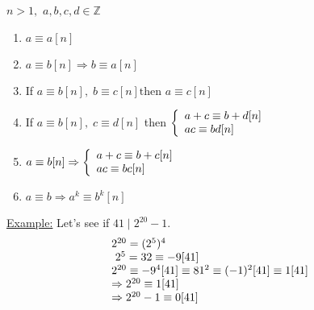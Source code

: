 \documentclass{report}
\begin{document}
\begin{thm} $n>1,$  $a,b,c,d \in \mathbb{Z}$
\begin{enumerate}
\item $a \equiv a[n]$
\item $a \equiv b[n] \Rightarrow b \equiv a [n]$
\item If  $a \equiv b[n], \; b \equiv c[n] \text{then } a\equiv c [n]$
\item If  $a \equiv b[n], \; c \equiv d[n]$ then $
	\left \{
	\begin{array}{l l l}
	a+c \equiv b+d [n]\\
	ac \equiv bd [n]
	\end{array}
	\right.
$
\item $a \equiv b[n] \Rightarrow 
	\left \{
	\begin{array}{l l l}
	a+c \equiv b+c[n]\\
	ac\equiv bc[n]
	\end{array}
	\right.
$
\item $a \equiv b \Rightarrow a^k \equiv b^k [n]$
\end{enumerate} 
\end{thm}
\underline{Example:}
Let's see if $41 \mid 2^{20}-1$.
\[
\begin{array}{l l l}
2^{20}=(2^5)^4\\\
2^5=32 \equiv -9[41]\\
2^{20} \equiv -9^4[41] \equiv 81^2 \equiv (-1)^2[41] \equiv 1[41]\\
\Rightarrow 2^{20} \equiv 1[41]\\
\Rightarrow 2^{20}-1\equiv 0[41]\\
\end{array}
\]
\end{document}
